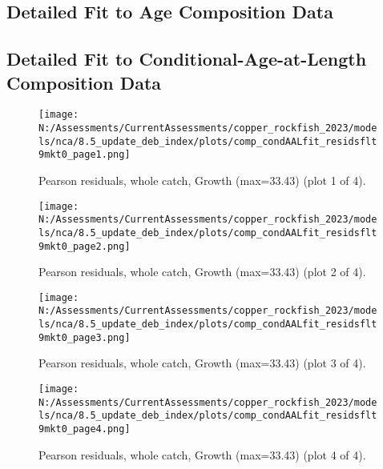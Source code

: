 \documentclass[11pt,
  english,
  letterpaper,
]{article}
\begin{document}
\newpage

\hypertarget{age-data}{%
\subsection{Detailed Fit to Age Composition Data}\label{age-data}}

\newpage

\hypertarget{caal-data}{%
\subsection{Detailed Fit to Conditional-Age-at-Length Composition Data}\label{caal-data}}

\begin{figure}
\centering
\texttt{[image: N:/Assessments/CurrentAssessments/copper\_rockfish\_2023/models/nca/8.5\_update\_deb\_index/plots/comp\_condAALfit\_residsflt9mkt0\_page1.png]}
\caption{Pearson residuals, whole catch, Growth (max=33.43) (plot 1 of 4).\label{fig:comp_condAALfit_residsflt9mkt0_page1}}
\end{figure}

\begin{figure}
\centering
\texttt{[image: N:/Assessments/CurrentAssessments/copper\_rockfish\_2023/models/nca/8.5\_update\_deb\_index/plots/comp\_condAALfit\_residsflt9mkt0\_page2.png]}
\caption{Pearson residuals, whole catch, Growth (max=33.43) (plot 2 of 4).\label{fig:comp_condAALfit_residsflt9mkt0_page2}}
\end{figure}

\begin{figure}
\centering
\texttt{[image: N:/Assessments/CurrentAssessments/copper\_rockfish\_2023/models/nca/8.5\_update\_deb\_index/plots/comp\_condAALfit\_residsflt9mkt0\_page3.png]}
\caption{Pearson residuals, whole catch, Growth (max=33.43) (plot 3 of 4).\label{fig:comp_condAALfit_residsflt9mkt0_page3}}
\end{figure}

\begin{figure}
\centering
\texttt{[image: N:/Assessments/CurrentAssessments/copper\_rockfish\_2023/models/nca/8.5\_update\_deb\_index/plots/comp\_condAALfit\_residsflt9mkt0\_page4.png]}
\caption{Pearson residuals, whole catch, Growth (max=33.43) (plot 4 of 4).\label{fig:comp_condAALfit_residsflt9mkt0_page4}}
\end{figure}
\end{document}
